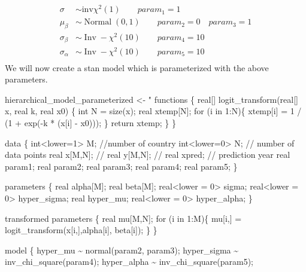 \documentclass[
]{article}
\newenvironment{Shaded}{\begin{snugshade}}{\end{snugshade}}
\newcommand{\NormalTok}[1]{#1}
\newcommand{\OtherTok}[1]{\textcolor[rgb]{0.56,0.35,0.01}{#1}}
\newcommand{\StringTok}[1]{\textcolor[rgb]{0.31,0.60,0.02}{#1}}
\begin{document}
\[
\begin{aligned}
\sigma &\sim \text{inv}\chi^2(1) \qquad param_1 = 1\\
\mu_{\beta} & \sim \operatorname{Normal}(0,1) \qquad param_2 = 0 \quad param_3 = 1\\
\sigma_{\beta} & \sim \operatorname{Inv}-\chi^{2}(10) \qquad param_4 = 10\\
\sigma_{\alpha} & \sim \operatorname{Inv}-\chi^{2}(10) \qquad param_5 = 10\\
\end{aligned}
\] We will now create a stan model which is parameterized with the above
parameters.

\begin{Shaded}
\begin{Highlighting}[]
\NormalTok{hierarchical\_model\_parameterized }\OtherTok{\textless{}{-}} \StringTok{"}
\StringTok{functions \{}
\StringTok{  real[] logit\_transform(real[] x, real k, real x0) \{}
\StringTok{    int N = size(x);}
\StringTok{    real xtemp[N];}
\StringTok{    for (i in 1:N)\{}
\StringTok{      xtemp[i] = 1 / (1 + exp({-}k * (x[i] {-} x0)));}
\StringTok{    \}}
\StringTok{     return xtemp;}
\StringTok{  \}}
\StringTok{\}}

\StringTok{data \{}
\StringTok{    int\textless{}lower=1\textgreater{} M; //number of country}
\StringTok{    int\textless{}lower=0\textgreater{} N; // number of data points}
\StringTok{    real x[M,N]; //}
\StringTok{    real y[M,N]; //}
\StringTok{    real xpred;  // prediction year}
\StringTok{    real param1;}
\StringTok{    real param2;}
\StringTok{    real param3;}
\StringTok{    real param4;}
\StringTok{    real param5;}
\StringTok{\}}

\StringTok{parameters \{}
\StringTok{  real alpha[M];}
\StringTok{  real beta[M];}
\StringTok{  real\textless{}lower = 0\textgreater{} sigma;}
\StringTok{  real\textless{}lower = 0\textgreater{} hyper\_sigma;}
\StringTok{  real hyper\_mu;}
\StringTok{  real\textless{}lower = 0\textgreater{} hyper\_alpha;}
\StringTok{\}}

\StringTok{transformed parameters \{}
\StringTok{  real mu[M,N];}
\StringTok{  for (i in 1:M)\{}
\StringTok{    mu[i,] = logit\_transform(x[i,],alpha[i], beta[i]);}
\StringTok{  \}}
\StringTok{\}}

\StringTok{model \{}
\StringTok{    hyper\_mu \textasciitilde{} normal(param2, param3);}
\StringTok{    hyper\_sigma \textasciitilde{} inv\_chi\_square(param4);}
\StringTok{    hyper\_alpha \textasciitilde{} inv\_chi\_square(param5);}


\end{Highlighting}
\end{Shaded}
\end{document}
